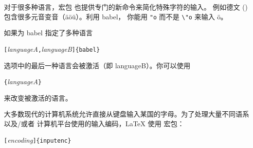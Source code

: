 对于很多种语言，宏包  也提供专门的新命令来简化特殊字符的输入。
例如德文 () 包含很多元音变音（\"a\"o\"u）。利用 \textsf{babel}，
你能用 \verb|"o| 而不是 \verb|\"o| 来输入 \"o。

如果为 babel 指定了多种语言
\begin{lscommand}
\verb|[|\emph{languageA}\verb|,|\emph{languageB}\verb|]{babel}|
\end{lscommand}
\noindent 选项中的最后一种语言会被激活（即 languageB）。你可以使用
\begin{lscommand}
\verb|{|\emph{languageA}\verb|}|
\end{lscommand}
\noindent 来改变被激活的语言。


\newcommand{\ieih}[1]{%
\index{encodings!input!#1@\texttt{#1}}%
\index{input encodings!#1@\texttt{#1}}%
\index{#1@\texttt{#1}}}
\newcommand{\iei}[1]{%
\ieih{#1}\texttt{#1}}
\newcommand{\feih}[1]{%
\index{encodings!font!#1@\texttt{#1}}%
\index{font encodings!#1@\texttt{#1}}%
\index{#1@\texttt{#1}}}
\newcommand{\fei}[1]{%
\feih{#1}\texttt{#1}}

大多数现代的计算机系统允许直接从键盘输入某国的字母。为了处理大量不同语系以及/或者
计算机平台使用的输入编码，\LaTeX{} 使用  宏包：
\begin{lscommand}
\verb|[|\emph{encoding}\verb|]{inputenc}|
\end{lscommand}

